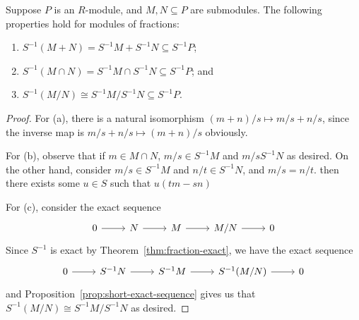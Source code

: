 \begin{proposition}\label{prop:fraction-properties}
    Suppose \(P\) is an \(R\)-module,
    and \(M,N \subseteq P\) are submodules.
    The following properties hold for modules of fractions:
    \begin{enumerate}[label={(\alph*)}, itemsep=0mm]
        \item \(S^{-1}(M+N) = S^{-1}M + S^{-1}N \subseteq S^{-1}P\);
        \item \(S^{-1}(M \cap N) = S^{-1}M \cap S^{-1}N \subseteq S^{-1}P\); and
        \item \(S^{-1}(M/N) \cong S^{-1}M/S^{-1}N \subseteq S^{-1}P\).
    \end{enumerate}
\end{proposition}
\begin{proof}
    For (a), there is a natural isomorphism \((m+n)/s \mapsto m/s + n/s\),
    since the inverse map is \(m/s + n/s \mapsto (m+n)/s\) obviously.

    For (b), observe that if \(m \in M \cap N\),
    \(m/s \in S^{-1}M\) and \(m/s S^{-1}N\) as desired.
    On the other hand, consider \(m/s \in S^{-1}M\) and \(n/t \in S^{-1}N\),
    and \(m/s = n/t\).
    then there exists some \(u \in S\) such that \(u(tm-sn)\)

    For (c), consider the exact sequence
    \begin{equation*}
        \begin{tikzcd}
            0 \arrow{r} & N \arrow{r} & M \arrow{r} & M/N \arrow{r} & 0
        \end{tikzcd}
    \end{equation*}
    Since \(S^{-1}\) is exact by Theorem~\ref{thm:fraction-exact},
    we have the exact sequence
    \begin{equation*}
        \begin{tikzcd}
            0 \arrow{r} & S^{-1}N \arrow{r} & S^{-1}M \arrow{r} & S^{-1}(M/N) \arrow{r} & 0
        \end{tikzcd}
    \end{equation*}
    and Proposition~\ref{prop:short-exact-sequence}
    gives us that \(S^{-1}(M/N) \cong S^{-1}M/S^{-1}N\) as desired.
\end{proof}

